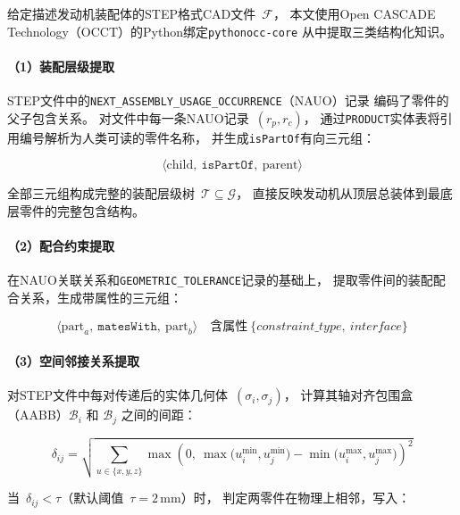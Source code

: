 给定描述发动机装配体的STEP格式CAD文件~$\mathcal{F}$，
本文使用Open CASCADE Technology（OCCT）的Python绑定\texttt{pythonocc-core}
从中提取三类结构化知识。

\paragraph{（1）装配层级提取}

STEP文件中的\texttt{NEXT\_ASSEMBLY\_USAGE\_OCCURRENCE}（NAUO）记录
编码了零件的父子包含关系。
对文件中每一条NAUO记录~$(r_p, r_c)$，
通过\texttt{PRODUCT}实体表将引用编号解析为人类可读的零件名称，
并生成\texttt{isPartOf}有向三元组：

\begin{equation}
  \langle \text{child},\ \texttt{isPartOf},\ \text{parent} \rangle
  \label{eq:ispartof}
\end{equation}

全部三元组构成完整的装配层级树~$\mathcal{T} \subseteq \mathcal{G}$，
直接反映发动机从顶层总装体到最底层零件的完整包含结构。

\paragraph{（2）配合约束提取}

在NAUO关联关系和\texttt{GEOMETRIC\_TOLERANCE}记录的基础上，
提取零件间的装配配合关系，生成带属性的三元组：

\begin{equation}
  \langle \text{part}_a,\ \texttt{matesWith},\ \text{part}_b \rangle
  \quad \text{含属性}\ \{\mathit{constraint\_type},\ \mathit{interface}\}
  \label{eq:mateswith}
\end{equation}

\paragraph{（3）空间邻接关系提取}

对STEP文件中每对传递后的实体几何体~$(\sigma_i, \sigma_j)$，
计算其轴对齐包围盒（AABB）$\mathcal{B}_i$ 和 $\mathcal{B}_j$ 之间的间距：

\begin{equation}
  \delta_{ij} =
  \sqrt{\sum_{u \in \{x,y,z\}}
    \max\!\left(0,\ \max\bigl(u_i^{\min}, u_j^{\min}\bigr)
                     - \min\bigl(u_i^{\max}, u_j^{\max}\bigr)\right)^{\!2}}
  \label{eq:gap}
\end{equation}

当~$\delta_{ij} < \tau$（默认阈值~$\tau = 2\,\text{mm}$）时，
判定两零件在物理上相邻，写入：

